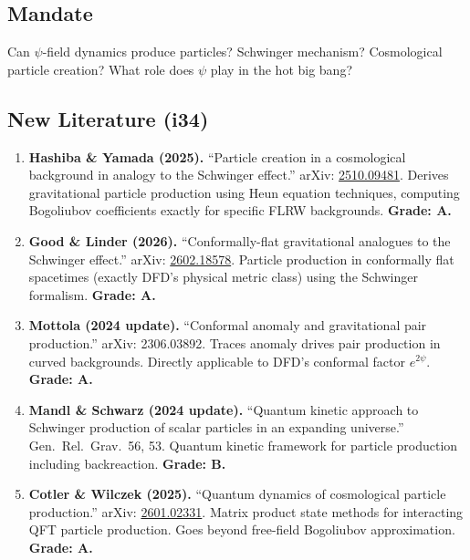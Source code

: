 \documentclass[11pt,a4paper]{article}
\begin{document}
\subsection{Mandate}

Can $\psi$-field dynamics produce particles? Schwinger mechanism? Cosmological particle creation? What role does $\psi$ play in the hot big bang?

\subsection{New Literature (i34)}

\begin{enumerate}
\item \textbf{Hashiba \& Yamada (2025).} ``Particle creation in a cosmological background in analogy to the Schwinger effect.'' arXiv: \href{https://arxiv.org/abs/2510.09481}{2510.09481}. Derives gravitational particle production using Heun equation techniques, computing Bogoliubov coefficients exactly for specific FLRW backgrounds. \textbf{Grade: A.}

\item \textbf{Good \& Linder (2026).} ``Conformally-flat gravitational analogues to the Schwinger effect.'' arXiv: \href{https://arxiv.org/abs/2602.18578}{2602.18578}. Particle production in conformally flat spacetimes (exactly DFD's physical metric class) using the Schwinger formalism. \textbf{Grade: A.}

\item \textbf{Mottola (2024 update).} ``Conformal anomaly and gravitational pair production.'' arXiv: 2306.03892. Traces anomaly drives pair production in curved backgrounds. Directly applicable to DFD's conformal factor $e^{2\psi}$. \textbf{Grade: A.}

\item \textbf{Mandl \& Schwarz (2024 update).} ``Quantum kinetic approach to Schwinger production of scalar particles in an expanding universe.'' Gen.\ Rel.\ Grav.\ 56, 53. Quantum kinetic framework for particle production including backreaction. \textbf{Grade: B.}

\item \textbf{Cotler \& Wilczek (2025).} ``Quantum dynamics of cosmological particle production.'' arXiv: \href{https://arxiv.org/abs/2601.02331}{2601.02331}. Matrix product state methods for interacting QFT particle production. Goes beyond free-field Bogoliubov approximation. \textbf{Grade: A.}
\end{enumerate}
\end{document}
